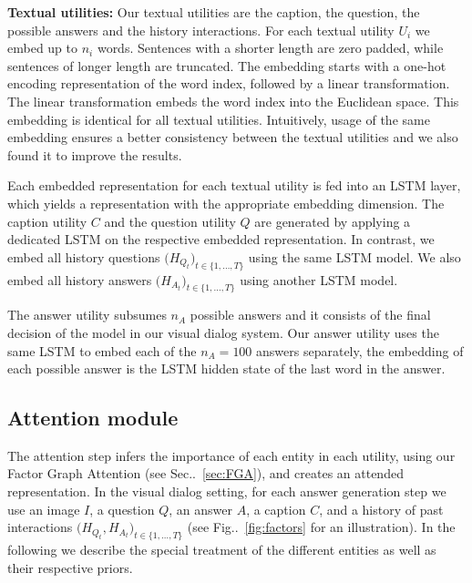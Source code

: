 \documentclass[10pt,twocolumn,letterpaper]{article}
\makeatletter
\def\@onedot{\ifx\@let@token.\else.\null\fi\xspace}
\DeclareRobustCommand\onedot{\futurelet\@let@token\@onedot}
\newcommand{\figref}[1]{Fig\onedot~\ref{#1}}
\newcommand{\secref}[1]{Sec\onedot~\ref{#1}}
\makeatother
\begin{document}
	\noindent\textbf{Textual utilities:} 
	Our textual utilities are the caption, the question, the possible answers and the history interactions. For each textual utility $ U_i $ we embed up to $n_i$ words. Sentences with a shorter length are zero padded, while sentences of longer length are truncated. The embedding starts with a one-hot encoding representation of the word index, followed by a linear transformation. The linear transformation embeds the word index into the Euclidean space. This embedding is identical for all  textual utilities. Intuitively, usage of the same embedding ensures a better consistency between the textual utilities and we also found it to improve the results. 
	
	Each  embedded representation for each textual utility is fed into an LSTM layer, 
	which yields a representation with the appropriate embedding dimension. The caption utility $C$ and the question utility $Q$ are generated by applying a dedicated LSTM on the respective embedded representation. In contrast, we embed all history questions $\big( H_{Q_t} \big)_{t\in\{1, \ldots, T\}}$ using the same LSTM model. We also embed all history answers $\big( H_{A_t} \big)_{t\in\{1, \ldots, T\}}$ using another LSTM model. 
	
	The answer utility subsumes $ n_A $ possible answers and it consists of the final decision of the model in our visual dialog system. Our answer utility uses the same LSTM to embed each of the $n_A = 100$ answers separately, the embedding of each possible answer is the LSTM hidden state of the last word in the answer. 
	
	




	
	






\subsection{Attention module}
\label{sec:atten}

The attention step infers the importance of each entity in each utility, using our Factor Graph Attention (see \secref{sec:FGA}), and creates an attended representation. In the visual dialog setting, for each answer generation step we use an image $I$, a question $Q$, an answer $A$, a caption $C$, and a history of past interactions $\big( H_{Q_t}, H_{A_t} \big)_{t\in\{1, \ldots, T\}}$ (see  \figref{fig:factors} for an illustration). In the following we describe the special treatment of the different entities as well as their respective priors. 
\end{document}
